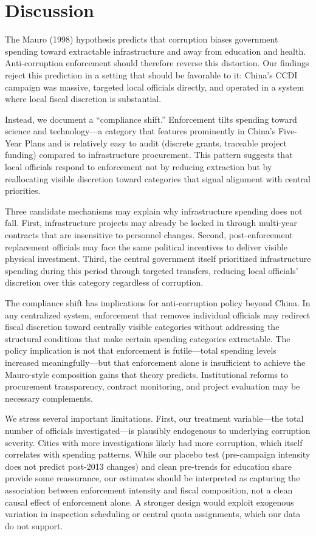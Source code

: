 \documentclass[12pt]{article}
\begin{document}



\section{Discussion}

The Mauro (1998) hypothesis predicts that corruption biases government spending toward extractable infrastructure and away from education and health. Anti-corruption enforcement should therefore reverse this distortion. Our findings reject this prediction in a setting that should be favorable to it: China's CCDI campaign was massive, targeted local officials directly, and operated in a system where local fiscal discretion is substantial.

Instead, we document a ``compliance shift.'' Enforcement tilts spending toward science and technology---a category that features prominently in China's Five-Year Plans and is relatively easy to audit (discrete grants, traceable project funding) compared to infrastructure procurement. This pattern suggests that local officials respond to enforcement not by reducing extraction but by reallocating visible discretion toward categories that signal alignment with central priorities.

Three candidate mechanisms may explain why infrastructure spending does not fall. First, infrastructure projects may already be locked in through multi-year contracts that are insensitive to personnel changes. Second, post-enforcement replacement officials may face the same political incentives to deliver visible physical investment. Third, the central government itself prioritized infrastructure spending during this period through targeted transfers, reducing local officials' discretion over this category regardless of corruption.

The compliance shift has implications for anti-corruption policy beyond China. In any centralized system, enforcement that removes individual officials may redirect fiscal discretion toward centrally visible categories without addressing the structural conditions that make certain spending categories extractable. The policy implication is not that enforcement is futile---total spending levels increased meaningfully---but that enforcement alone is insufficient to achieve the Mauro-style composition gains that theory predicts. Institutional reforms to procurement transparency, contract monitoring, and project evaluation may be necessary complements.

We stress several important limitations. First, our treatment variable---the total number of officials investigated---is plausibly endogenous to underlying corruption severity. Cities with more investigations likely had more corruption, which itself correlates with spending patterns. While our placebo test (pre-campaign intensity does not predict post-2013 changes) and clean pre-trends for education share provide some reassurance, our estimates should be interpreted as capturing the association between enforcement intensity and fiscal composition, not a clean causal effect of enforcement alone. A stronger design would exploit exogenous variation in inspection scheduling or central quota assignments, which our data do not support.
\end{document}
